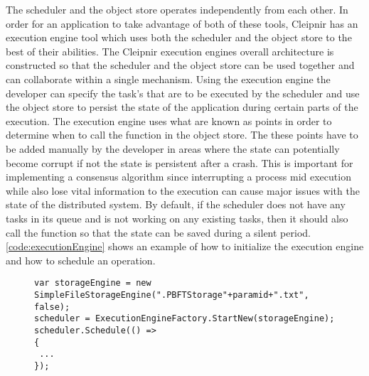The scheduler and the object store operates independently from each other. In order for an application to take advantage of both of these tools, Cleipnir has an execution engine tool which uses both the scheduler and the object store to the best of their abilities.
The Cleipnir execution engines overall architecture is constructed so that the scheduler and the object store can be used together and can collaborate within a single mechanism. Using the execution engine the developer can specify the task's that are to be executed by the scheduler and use the object store to persist the state of the application during certain parts of the execution. The execution engine uses what are known as  points in order to determine when to call the  function in the object store. The these points have to be added manually by the developer in areas where the state can potentially become corrupt if not the state is persistent after a crash. This is important for implementing a consensus algorithm since interrupting a process mid execution while also lose vital information to the execution can cause major issues with the state of the distributed system. By default, if the scheduler does not have any tasks in its queue and is not working on any existing tasks, then it should also call the  function so that the state can be saved during a silent period. \autoref{code:executionEngine} shows an example of how to initialize the execution engine and how to schedule an operation\cite[p.~11]{PAPER:PaxosCleipnir}.

\begin{figure}[H]
	\centering
	\begin{lstlisting}[label = code:executionEngine, caption=Execution engine example, captionpos=b, basicstyle=\scriptsize]
var storageEngine = new SimpleFileStorageEngine(".PBFTStorage"+paramid+".txt", false);
scheduler = ExecutionEngineFactory.StartNew(storageEngine);
scheduler.Schedule(() => 
{
 ...
});
	\end{lstlisting}
\end{figure}

